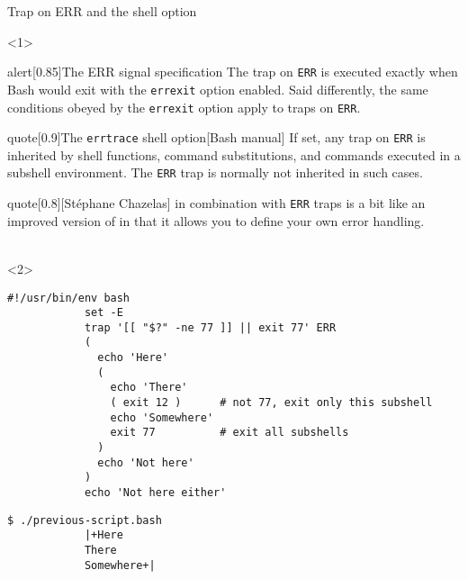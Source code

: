 \begin{frame}[fragile]{Trap on ERR and the  shell option}
    \vspace{-1mm}
    \begin{onlyenv}<1>
        \begin{varblock}{alert}[0.85\textwidth]{The ERR signal specification}
            The trap on \texttt{ERR} is executed exactly when Bash would exit with the \texttt{errexit} option enabled.
            Said differently, the same conditions obeyed by the \texttt{errexit} option apply to traps on \texttt{ERR}.
        \end{varblock}
        \begin{varblock}{quote}[0.9\textwidth]{The \;\texttt{errtrace}\; shell option}[Bash manual]
            If set, any trap on \texttt{ERR} is inherited by shell functions, command substitutions, and commands executed in a subshell environment.
            The \texttt{ERR} trap is normally not inherited in such cases.
        \end{varblock}
        \begin{varblock}{quote}[0.8\textwidth]{}[St\'ephane Chazelas]
             in combination with \texttt{ERR} traps is a bit like an improved version of  in that it allows you to define your own error handling.\\[-0.5em] ~
        \end{varblock}
    \end{onlyenv}
    \begin{onlyenv}<2>
        \begin{lstlisting}[style=myBash, aboveskip=2mm]
            #!/usr/bin/env bash
            set -E
            trap '[[ "$?" -ne 77 ]] || exit 77' ERR
            (
              echo 'Here'
              (
                echo 'There'
                ( exit 12 )      # not 77, exit only this subshell
                echo 'Somewhere'
                exit 77          # exit all subshells
              )
              echo 'Not here'
            )
            echo 'Not here either'
        \end{lstlisting}
        \begin{lstlisting}[style=myBash, aboveskip=2mm, numbers=none]
            $ ./previous-script.bash
            |+Here
            There
            Somewhere+|
        \end{lstlisting}
    \end{onlyenv}
\end{frame}
